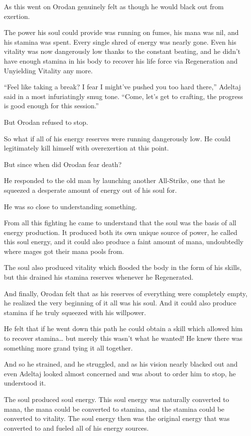 \documentclass[a4paper,10pt]{book}
\begin{document}
As this went on Orodan genuinely felt as though he would black out from exertion.\par
The power his soul could provide was running on fumes, his mana was nil, and his stamina was spent. Every single shred of energy was nearly gone. Even his vitality was now dangerously low thanks to the constant beating, and he didn’t have enough stamina in his body to recover his life force via Regeneration and Unyielding Vitality any more.\par
“Feel like taking a break? I fear I might’ve pushed you too hard there,” Adeltaj said in a most infuriatingly smug tone. “Come, let’s get to crafting, the progress is good enough for this session.”\par
But Orodan refused to stop.\par
So what if all of his energy reserves were running dangerously low. He could legitimately kill himself with overexertion at this point.\par
But since when did Orodan fear death?\par
He responded to the old man by launching another All-Strike, one that he squeezed a desperate amount of energy out of his soul for.\par
He was so close to understanding something.\par
From all this fighting he came to understand that the soul was the basis of all energy production. It produced both its own unique source of power, he called this soul energy, and it could also produce a faint amount of mana, undoubtedly where mages got their mana pools from.\par
The soul also produced vitality which flooded the body in the form of his skills, but this drained his stamina reserves whenever he Regenerated.\par
And finally, Orodan felt that as his reserves of everything were completely empty, he realized the very beginning of it all was his soul. And it could also produce stamina if he truly squeezed with his willpower.\par
He felt that if he went down this path he could obtain a skill which allowed him to recover stamina… but merely this wasn’t what he wanted! He knew there was something more grand tying it all together.\par
And so he strained, and he struggled, and as his vision nearly blacked out and even Adeltaj looked almost concerned and was about to order him to stop, he understood it.\par
The soul produced soul energy. This soul energy was naturally converted to mana, the mana could be converted to stamina, and the stamina could be converted to vitality. The soul energy then was the original energy that was converted to and fueled all of his energy sources.\par
\end{document}
